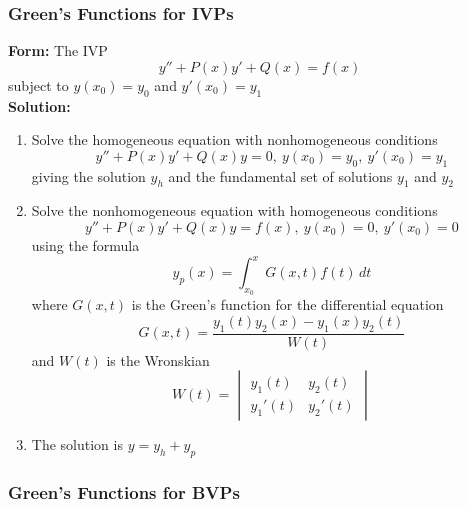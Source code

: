 \documentclass{article}
\begin{document}
\subsubsection{Green's Functions for IVPs}

\textbf{Form:} The IVP \[y'' + P(x) y' + Q(x) = f(x)\] subject to $y(x_0) = y_0$ and $y'(x_0) = y_1$ \\ \textbf{Solution:} \begin{enumerate}
  \item Solve the homogeneous equation with nonhomogeneous conditions \[y'' + P(x) y' + Q(x) y = 0, \: y(x_0) = y_0, \: y'(x_0) = y_1\] giving the solution $y_h$ and the fundamental set of solutions $y_1$ and $y_2$

  \item Solve the nonhomogeneous equation with homogeneous conditions \[y'' + P(x) y' + Q(x) y = f(x), \: y(x_0) = 0, \: y'(x_0) = 0\] using the formula \[y_p(x) = \int_{x_0}^x G(x, t) f(t) \,dt\] where $G(x, t)$ is the Green's function for the differential equation \[G(x, t) = \frac{y_1(t) y_2(x) - y_1(x) y_2(t)}{W(t)}\] and $W(t)$ is the Wronskian \[W(t) = \begin{vmatrix}
            y_1(t)  & y_2(t)  \\
            y_1'(t) & y_2'(t)
          \end{vmatrix}\]

  \item The solution is $y = y_h + y_p$
\end{enumerate}

\subsubsection{Green's Functions for BVPs}
\end{document}
